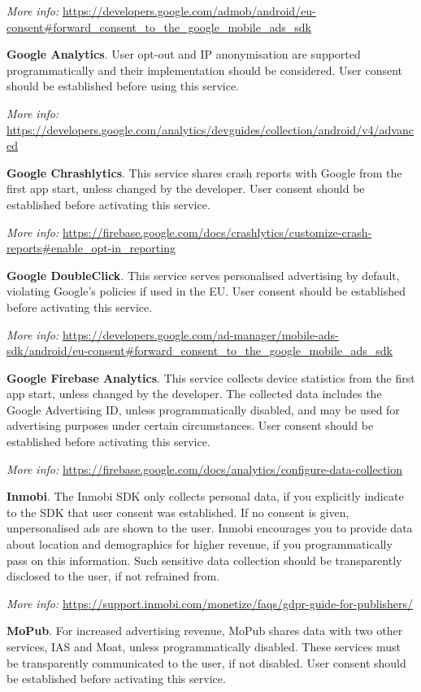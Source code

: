 \documentclass[
]{book}
\begin{document}
\emph{More info:} \url{https://developers.google.com/admob/android/eu-consent\#forward_consent_to_the_google_mobile_ads_sdk}

\textbf{Google Analytics}. User opt-out and IP anonymisation are supported programmatically and their implementation should be considered. User consent should be established before using this service.

\emph{More info:} \url{https://developers.google.com/analytics/devguides/collection/android/v4/advanced}

\textbf{Google Chrashlytics}. This service shares crash reports with Google from the first app start, unless changed by the developer. User consent should be established before activating this service.

\emph{More info:} \url{https://firebase.google.com/docs/crashlytics/customize-crash-reports\#enable_opt-in_reporting}

\textbf{Google DoubleClick}. This service serves personalised advertising by default, violating Google's policies if used in the EU. User consent should be established before activating this service.

\emph{More info:} \url{https://developers.google.com/ad-manager/mobile-ads-sdk/android/eu-consent\#forward_consent_to_the_google_mobile_ads_sdk}

\textbf{Google Firebase Analytics}. This service collects device statistics from the first app start, unless changed by the developer. The collected data includes the Google Advertising ID, unless programmatically disabled, and may be used for advertising purposes under certain circumstances. User consent should be established before activating this service.

\emph{More info:} \url{https://firebase.google.com/docs/analytics/configure-data-collection}

\textbf{Inmobi}. The Inmobi SDK only collects personal data, if you explicitly indicate to the SDK that user consent was established. If no consent is given, unpersonalised ads are shown to the user. Inmobi encourages you to provide data about location and demographics for higher revenue, if you programmatically pass on this information. Such sensitive data collection should be transparently disclosed to the user, if not refrained from.

\emph{More info:} \url{https://support.inmobi.com/monetize/faqs/gdpr-guide-for-publishers/}

\textbf{MoPub}. For increased advertising revenue, MoPub shares data with two other services, IAS and Moat, unless programmatically disabled. These services must be transparently communicated to the user, if not disabled. User consent should be established before activating this service.
\end{document}
